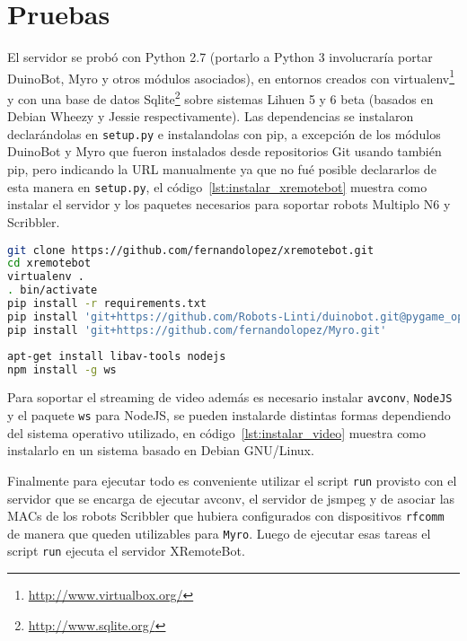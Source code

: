 \chapter{Pruebas}\label{cha:pruebas}

El servidor se probó con Python 2.7 (portarlo a Python 3 involucraría
portar DuinoBot, Myro y otros módulos asociados), en entornos creados
con virtualenv\footnote{\url{http://www.virtualbox.org/}}
y con una base de datos
Sqlite\footnote{\url{http://www.sqlite.org/}}
sobre
sistemas Lihuen 5 y 6 beta (basados en Debian Wheezy y Jessie respectivamente).
Las dependencias se instalaron declarándolas en \texttt{setup.py} e instalandolas
con pip, a excepción de los módulos DuinoBot y Myro que fueron instalados
desde repositorios Git usando también pip, pero indicando la URL manualmente
ya que no fué posible declararlos de esta manera en \texttt{setup.py}, el
código~\ref{lst:instalar_xremotebot} muestra como instalar el servidor
y los paquetes necesarios para soportar robots Multiplo N6 y Scribbler.

\begin{lstlisting}[language=bash,
caption={Instalación de XRemoteBot},
label=lst:instalar_xremotebot]
git clone https://github.com/fernandolopez/xremotebot.git
cd xremotebot
virtualenv .
. bin/activate
pip install -r requirements.txt
pip install 'git+https://github.com/Robots-Linti/duinobot.git@pygame_opcional'
pip install 'git+https://github.com/fernandolopez/Myro.git'
\end{lstlisting}

\begin{lstlisting}[language=bash,
caption={Instalación del soporte de video para XRemoteBot},
label=lst:instalar_video]
apt-get install libav-tools nodejs
npm install -g ws
\end{lstlisting}

Para soportar el streaming de video además es necesario instalar
\texttt{avconv}, \texttt{NodeJS} y el paquete \texttt{ws} para NodeJS,
se pueden instalarde distintas formas dependiendo del sistema operativo
utilizado, en código~\ref{lst:instalar_video} muestra como instalarlo
en un sistema basado en Debian GNU/Linux.

Finalmente para ejecutar todo es conveniente utilizar el script
\texttt{run} provisto con el servidor que se encarga de ejecutar
avconv, el servidor de jsmpeg y de asociar las MACs de los
robots Scribbler que hubiera configurados con dispositivos
\texttt{rfcomm} de manera que queden utilizables para \texttt{Myro}.
Luego de ejecutar esas tareas el script \texttt{run} ejecuta
el servidor XRemoteBot.

